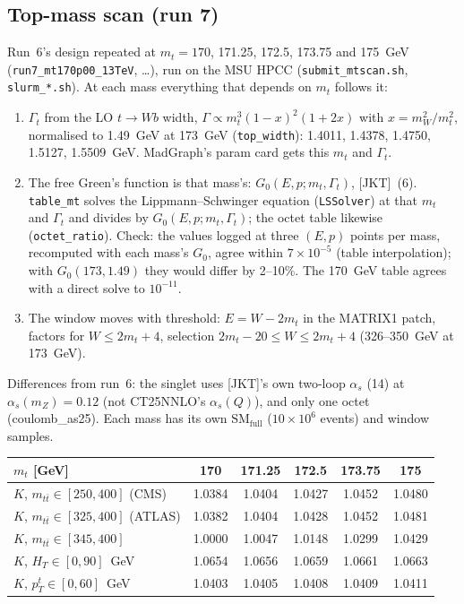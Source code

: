 \documentclass[11pt]{article}
\newcommand{\code}[1]{\texttt{#1}}
\newcommand{\Gt}{\Gamma_t}
\newcommand{\JKT}{[JKT]}
\newcommand{\SMfull}{\mathrm{SM}_\mathrm{full}}
\begin{document}
\subsection{Top-mass scan (run 7)}
\label{sec:mtscan}
Run~6's design repeated at $m_t=170$, 171.25, 172.5, 173.75 and 175~GeV (\code{run7\_mt170p00\_13TeV}, \ldots), run on the MSU
HPCC (\code{submit\_mtscan.sh}, \code{slurm\_*.sh}). At each mass everything that depends on $m_t$ follows it:
\begin{enumerate}
  \item $\Gt$ from the LO $t\to Wb$ width, $\Gamma\propto m_t^3(1-x)^2(1+2x)$ with $x=m_W^2/m_t^2$, normalised to 1.49~GeV at
        173~GeV (\code{top\_width}): 1.4011, 1.4378, 1.4750, 1.5127, 1.5509~GeV. MadGraph's param card gets this $m_t$ and $\Gt$.
  \item The free Green's function is that mass's: $G_0(E,p;m_t,\Gt)$, \JKT\ (6). \code{table\_mt} solves the Lippmann--Schwinger
        equation (\code{LSSolver}) at that $m_t$ and $\Gt$ and divides by $G_0(E,p;m_t,\Gt)$; the octet table likewise
        (\code{octet\_ratio}). Check: the values logged at three $(E,p)$ points per mass, recomputed with each mass's $G_0$,
        agree within $7\times10^{-5}$ (table interpolation); with $G_0(173,1.49)$ they would differ by 2--10\%. The 170~GeV
        table agrees with a direct solve to $10^{-11}$.
  \item The window moves with threshold: $E=W-2m_t$ in the MATRIX1 patch, factors for $W\le2m_t+4$, selection
        $2m_t-20\le W\le2m_t+4$ (326--350~GeV at 173~GeV).
\end{enumerate}
Differences from run~6: the singlet uses \JKT's own two-loop $\alpha_s$ (14) at $\alpha_s(m_Z)=0.12$ (not CT25NNLO's $\alpha_s(Q)$),
and only one octet (coulomb\_as25). Each mass has its own $\SMfull$ ($10\times10^6$ events) and window samples.
\begin{center}\small
\begin{tabular}{@{}lccccc@{}}
\toprule
$m_t$ [GeV] & 170 & 171.25 & 172.5 & 173.75 & 175\\
\midrule
$K$, $m_{t\bar t}\in[250,400]$ (CMS) & 1.0384 & 1.0404 & 1.0427 & 1.0452 & 1.0480\\
$K$, $m_{t\bar t}\in[325,400]$ (ATLAS) & 1.0382 & 1.0404 & 1.0428 & 1.0452 & 1.0481\\
$K$, $m_{t\bar t}\in[345,400]$ & 1.0000 & 1.0047 & 1.0148 & 1.0299 & 1.0429\\
$K$, $H_T\in[0,90]$~GeV & 1.0654 & 1.0656 & 1.0659 & 1.0661 & 1.0663\\
$K$, $p_T^t\in[0,60]$~GeV & 1.0403 & 1.0405 & 1.0408 & 1.0409 & 1.0411\\
\bottomrule
\end{tabular}
\end{center}
\end{document}

